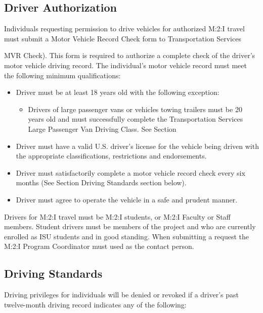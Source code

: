 \subsection{Driver Authorization}

Individuals requesting permission to drive vehicles for authorized M:2:I travel must submit a Motor Vehicle Record Check form to Transportation Services {MVR Check). This form is required to authorize a complete check of the driver's motor vehicle driving record. The individual's motor vehicle record must meet the following minimum qualifications:

\begin{itemize}
\item Driver must be at least 18 years old with the following exception:
\begin{itemize}
\item Drivers of large passenger vans or vehicles towing trailers must be 20 years old and must successfully complete the Transportation Services Large Passenger Van Driving Class.  See Section
\end{itemize}
\item Driver must have a valid U.S. driver's license for the vehicle being driven with the appropriate classifications, restrictions and endorsements.
\item Driver must satisfactorily complete a motor vehicle record check every six months (See Section Driving Standards section below).
\item Driver must agree to operate the vehicle in a safe and prudent manner.
\end{itemize}

Drivers for M:2:I travel must be M:2:I students, or M:2:I Faculty or Staff members.  Student drivers must be members of the project and who are currently enrolled as ISU students and in good standing.  When submitting a request the M:2:I Program Coordinator must used as the contact person.

\subsection{Driving Standards}

Driving privileges for individuals will be denied or revoked if a driver's past twelve-month driving record indicates any of the following:

}

